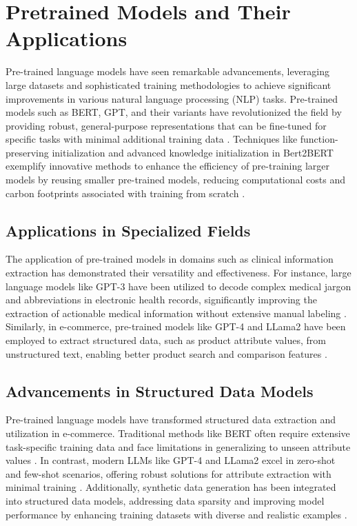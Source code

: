 \section{Pretrained Models and Their Applications}

Pre-trained language models have seen remarkable advancements, leveraging large datasets and sophisticated training methodologies to achieve significant improvements in various natural language processing (NLP) tasks. Pre-trained models such as BERT, GPT, and their variants have revolutionized the field by providing robust, general-purpose representations that can be fine-tuned for specific tasks with minimal additional training data \cite{chen-etal-2022-bert2bert}. Techniques like function-preserving initialization and advanced knowledge initialization in Bert2BERT exemplify innovative methods to enhance the efficiency of pre-training larger models by reusing smaller pre-trained models, reducing computational costs and carbon footprints associated with training from scratch \cite{chen-etal-2022-bert2bert}.

\subsection{Applications in Specialized Fields}
The application of pre-trained models in domains such as clinical information extraction has demonstrated their versatility and effectiveness. For instance, large language models like GPT-3 have been utilized to decode complex medical jargon and abbreviations in electronic health records, significantly improving the extraction of actionable medical information without extensive manual labeling \cite{agrawal2022large}. Similarly, in e-commerce, pre-trained models like GPT-4 and LLama2 have been employed to extract structured data, such as product attribute values, from unstructured text, enabling better product search and comparison features \cite{brinkmann2024product}. 

\subsection{Advancements in Structured Data Models}
Pre-trained language models have transformed structured data extraction and utilization in e-commerce. Traditional methods like BERT often require extensive task-specific training data and face limitations in generalizing to unseen attribute values \cite{brinkmann2024product}. In contrast, modern LLMs like GPT-4 and LLama2 excel in zero-shot and few-shot scenarios, offering robust solutions for attribute extraction with minimal training \cite{brinkmann2024product}. Additionally, synthetic data generation has been integrated into structured data models, addressing data sparsity and improving model performance by enhancing training datasets with diverse and realistic examples \cite{skondras2023generating}.

